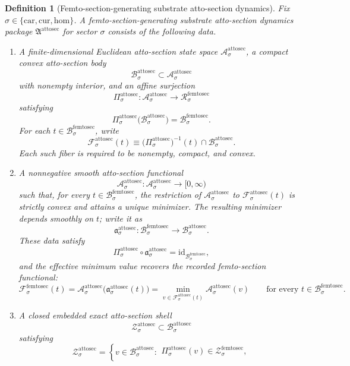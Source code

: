 \documentclass[11pt]{article}
\newcommand{\Car}{\mathrm{car}}
\newcommand{\Cur}{\mathrm{cur}}
\newcommand{\Hom}{\mathrm{hom}}
\newcommand{\FemtoSectionSpace}[1]{\mathcal R_{#1}^{\mathrm{femtosec}}}
\newcommand{\FemtoSectionBody}[1]{\mathcal B_{#1}^{\mathrm{femtosec}}}
\newcommand{\FemtoSectionFunctional}[1]{\mathscr F_{#1}^{\mathrm{femtosec}}}
\newcommand{\FemtoSectionShell}[1]{\mathcal Z_{#1}^{\mathrm{femtosec}}}
\newcommand{\AttoSectionPackage}{\mathfrak A^{\mathrm{attosec}}}
\newcommand{\AttoSectionSpace}[1]{\mathcal A_{#1}^{\mathrm{attosec}}}
\newcommand{\AttoSectionBody}[1]{\mathcal B_{#1}^{\mathrm{attosec}}}
\newcommand{\AttoSectionProj}[1]{\Pi_{#1}^{\mathrm{attosec}}}
\newcommand{\AttoSectionFiber}[2]{\mathcal F_{#1}^{\mathrm{attosec}}(#2)}
\newcommand{\AttoSectionFemtoMin}[1]{\mathfrak a_{#1}^{\mathrm{attosec}}}
\newcommand{\AttoSectionFunctional}[1]{\mathscr A_{#1}^{\mathrm{attosec}}}
\newcommand{\AttoSectionShell}[1]{\mathcal Z_{#1}^{\mathrm{attosec}}}
\newtheorem{definition}{Definition}
\begin{document}
\begin{definition}[Femto-section-generating substrate atto-section dynamics]
\label{def:attosec}
Fix \(\sigma\in\{\Car,\Cur,\Hom\}\). A \emph{femto-section-generating substrate atto-section dynamics package} \(\AttoSectionPackage\) for sector \(\sigma\) consists of the following data.
\begin{enumerate}
    \item A finite-dimensional Euclidean atto-section state space \(\AttoSectionSpace{\sigma}\), a compact convex atto-section body
    \[
    \AttoSectionBody{\sigma}\subset\AttoSectionSpace{\sigma}
    \]
    with nonempty interior, and an affine surjection
    \[
    \AttoSectionProj{\sigma}:\AttoSectionSpace{\sigma}\to\FemtoSectionSpace{\sigma}
    \]
    satisfying
    \[
    \AttoSectionProj{\sigma}\bigl(\AttoSectionBody{\sigma}\bigr)=\FemtoSectionBody{\sigma}.
    \]
    For each \(t\in\FemtoSectionBody{\sigma}\), write
    \[
    \AttoSectionFiber{\sigma}{t}
    \equiv
    \bigl(\AttoSectionProj{\sigma}\bigr)^{-1}(t)\cap\AttoSectionBody{\sigma}.
    \]
    Each such fiber is required to be nonempty, compact, and convex.
    \item A nonnegative smooth atto-section functional
    \[
    \AttoSectionFunctional{\sigma}:\AttoSectionSpace{\sigma}\to[0,\infty)
    \]
    such that, for every \(t\in\FemtoSectionBody{\sigma}\), the restriction of \(\AttoSectionFunctional{\sigma}\) to \(\AttoSectionFiber{\sigma}{t}\) is strictly convex and attains a unique minimizer. The resulting minimizer depends smoothly on \(t\); write it as
    \[
    \AttoSectionFemtoMin{\sigma}:\FemtoSectionBody{\sigma}\to\AttoSectionBody{\sigma}.
    \]
    These data satisfy
    \[
    \AttoSectionProj{\sigma}\circ\AttoSectionFemtoMin{\sigma}
    =
    \mathrm{id}_{\FemtoSectionBody{\sigma}},
    \]
    and the effective minimum value recovers the recorded femto-section functional:
    \[
    \FemtoSectionFunctional{\sigma}(t)
    =
    \AttoSectionFunctional{\sigma}\bigl(\AttoSectionFemtoMin{\sigma}(t)\bigr)
    =
    \min_{v\in\AttoSectionFiber{\sigma}{t}}
    \AttoSectionFunctional{\sigma}(v)
    \qquad
    \text{for every }
    t\in\FemtoSectionBody{\sigma}.
    \]
    \item A closed embedded exact atto-section shell
    \[
    \AttoSectionShell{\sigma}\subset\AttoSectionBody{\sigma}
    \]
    satisfying
    \[
    \AttoSectionShell{\sigma}
    =
    \left\{
    v\in\AttoSectionBody{\sigma}:
    \begin{array}{l}
    \AttoSectionProj{\sigma}(v)\in\FemtoSectionShell{\sigma},\\[0.2em]

\end{array}\]
\end{enumerate}
\end{definition}
\end{document}
